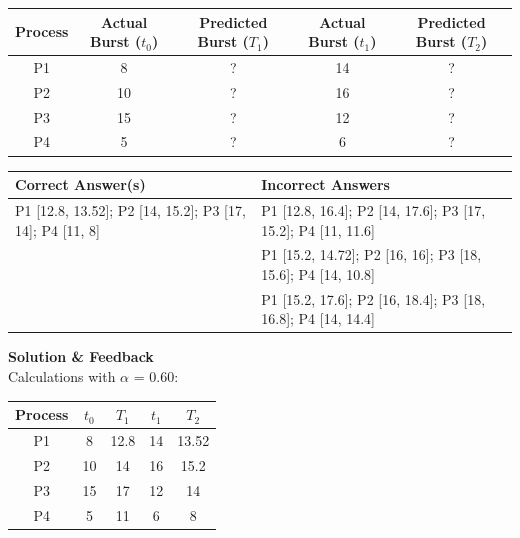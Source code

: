 \begin{tabular}{|c|c|c|c|c|}
\hline
Process & Actual Burst ($t_0$) & Predicted Burst ($T_1$) & Actual Burst ($t_1$) & Predicted Burst ($T_2$) \\
\hline
P1 & 8 & ? & 14 & ? \\
P2 & 10 & ? & 16 & ? \\
P3 & 15 & ? & 12 & ? \\
P4 & 5 & ? & 6 & ? \\
\hline
\end{tabular}

\begin{center}
\begin{tabular}{|l|l|}
\hline
\textbf{Correct Answer(s)} & \textbf{Incorrect Answers} \\
\hline
P1 [12.8, 13.52]; P2 [14, 15.2]; P3 [17, 14]; P4 [11, 8] & P1 [12.8, 16.4]; P2 [14, 17.6]; P3 [17, 15.2]; P4 [11, 11.6] \\
 & P1 [15.2, 14.72]; P2 [16, 16]; P3 [18, 15.6]; P4 [14, 10.8] \\
 & P1 [15.2, 17.6]; P2 [16, 18.4]; P3 [18, 16.8]; P4 [14, 14.4] \\
\hline
\end{tabular}
\end{center}

\textbf{Solution \& Feedback}\\
Calculations with $\alpha$ = 0.60:
\begin{tabular}{|c|c|c|c|c|}
\hline
Process & $t_0$ & $T_1$ & $t_1$ & $T_2$ \\
\hline
P1 & 8 & 12.8 & 14 & 13.52 \\
P2 & 10 & 14 & 16 & 15.2 \\
P3 & 15 & 17 & 12 & 14 \\
P4 & 5 & 11 & 6 & 8 \\
\hline
\end{tabular}